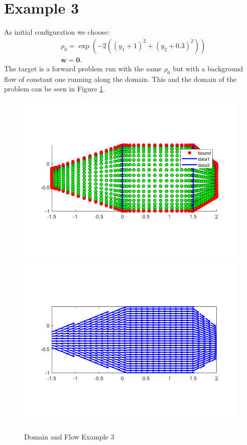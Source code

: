 \documentclass[11pt, a4paper]{article}
\theoremstyle{definition}
\newcommand{\w}{\mathbf{w}}
\begin{document}
\section{Example 3}
As initial configuration we choose:
\begin{align*}
&\rho_0 = \exp(-2((y_1 + 1)^2 + (y_2 + 0.3)^2))\\
&\w = \mathbf{0}.
\end{align*}	
The target is a forward problem run with the same $\rho_0$ but with a background flow of constant one running along the domain. This and the domain of the problem can be seen in Figure \ref{Dom3}.
\begin{figure}[h]
	\centering
	\includegraphics[scale=0.4]{Dom3.png}
	\includegraphics[scale=0.4]{Flow3.png}
	\caption{Domain and Flow Example 3} 
	\label{Dom3}
\end{figure}	
	
\end{document}
